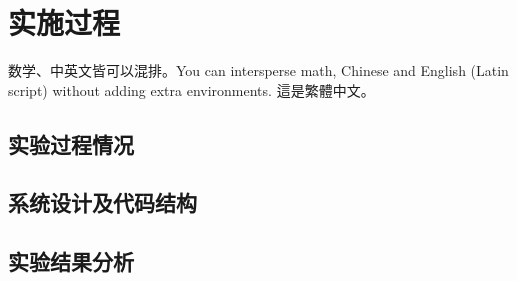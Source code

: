 \section{实施过程}
\songti
数学、中英文皆可以混排。You can intersperse math, Chinese and English (Latin script) without adding extra environments.
這是繁體中文。

\subsection{实验过程情况}

\subsection{系统设计及代码结构}

\subsection{实验结果分析}